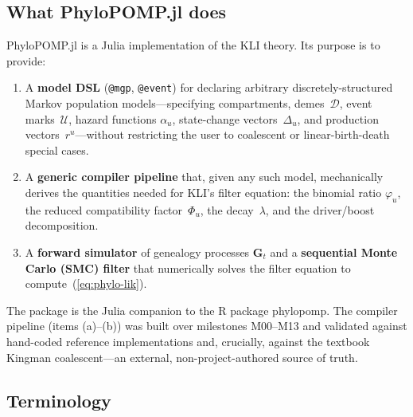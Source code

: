 \documentclass[11pt,leqno]{article}
\newcommand{\Xr}{\mathbf{X}}        %
\newcommand{\Gr}{\mathbf{G}}        %
\newcommand{\Ur}{\mathbf{U}}        %
\newcommand{\Xspace}{\mathcal{X}}   %
\newcommand{\Jumps}{\mathcal{U}}    %
\newcommand{\Demes}{\mathcal{D}}    %
\newcommand{\Zp}{\mathbb{Z}_{\ge 0}}
\newcommand{\lik}{\mathcal{L}}      %
\newcommand{\indicator}[1]{\mathbf{1}_{#1}}
\newcommand{\pkg}[1]{\textsf{#1}}
\newcommand{\code}[1]{\texttt{#1}}
\newcommand{\deme}[1]{\mathsf{#1}}
\theoremstyle{plain}
\theoremstyle{definition}
\begin{document}
\subsection{What \pkg{PhyloPOMP.jl} does}

\pkg{PhyloPOMP.jl} is a Julia implementation of the KLI theory.  Its purpose
is to provide:
\begin{enumerate}
  \item[(a)] A \textbf{model DSL} (\code{@mgp}, \code{@event}) for declaring
    arbitrary discretely-structured Markov population models---specifying
    compartments, demes~$\Demes$, event marks~$\Jumps$, hazard functions
    $\alpha_u$, state-change vectors~$\Delta_u$, and production
    vectors~$r^u$---without restricting the user to coalescent or
    linear-birth-death special cases.

  \item[(b)] A \textbf{generic compiler pipeline} that, given any such model,
    mechanically derives the quantities needed for KLI's filter equation:
    the binomial ratio $\varphi_u$, the reduced compatibility
    factor~$\Phi_u$, the decay~$\lambda$, and the driver/boost
    decomposition.

  \item[(c)] A \textbf{forward simulator} of genealogy processes
    $\Gr_t$ and a \textbf{sequential Monte Carlo (SMC) filter} that
    numerically solves the filter equation to compute~(\ref{eq:phylo-lik}).
\end{enumerate}

The package is the Julia companion to the R package \pkg{phylopomp}.  The
compiler pipeline (items (a)--(b)) was built over milestones M00--M13 and
validated against hand-coded reference implementations and, crucially, against
the textbook Kingman coalescent---an external, non-project-authored source of
truth.


\subsection{Terminology}
\label{sec:terminology}
\end{document}
